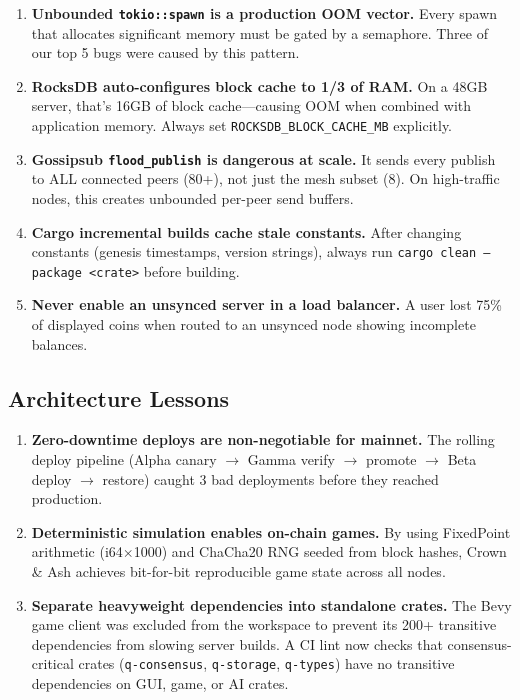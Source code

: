\documentclass[11pt,a4paper]{article}
\begin{document}
\begin{enumerate}[leftmargin=*]
    \item \textbf{Unbounded \texttt{tokio::spawn} is a production OOM vector.} Every spawn that allocates significant memory must be gated by a semaphore. Three of our top 5 bugs were caused by this pattern.

    \item \textbf{RocksDB auto-configures block cache to 1/3 of RAM.} On a 48GB server, that's 16GB of block cache---causing OOM when combined with application memory. Always set \texttt{ROCKSDB\_BLOCK\_CACHE\_MB} explicitly.

    \item \textbf{Gossipsub \texttt{flood\_publish} is dangerous at scale.} It sends every publish to ALL connected peers (80+), not just the mesh subset (8). On high-traffic nodes, this creates unbounded per-peer send buffers.

    \item \textbf{Cargo incremental builds cache stale constants.} After changing constants (genesis timestamps, version strings), always run \texttt{cargo clean --package <crate>} before building.

    \item \textbf{Never enable an unsynced server in a load balancer.} A user lost 75\% of displayed coins when routed to an unsynced node showing incomplete balances.
\end{enumerate}

\subsection{Architecture Lessons}

\begin{enumerate}[leftmargin=*]
    \item \textbf{Zero-downtime deploys are non-negotiable for mainnet.} The rolling deploy pipeline (Alpha canary $\rightarrow$ Gamma verify $\rightarrow$ promote $\rightarrow$ Beta deploy $\rightarrow$ restore) caught 3 bad deployments before they reached production.

    \item \textbf{Deterministic simulation enables on-chain games.} By using FixedPoint arithmetic (i64$\times$1000) and ChaCha20 RNG seeded from block hashes, Crown \& Ash achieves bit-for-bit reproducible game state across all nodes.

    \item \textbf{Separate heavyweight dependencies into standalone crates.} The Bevy game client was excluded from the workspace to prevent its 200+ transitive dependencies from slowing server builds. A CI lint now checks that consensus-critical crates (\texttt{q-consensus}, \texttt{q-storage}, \texttt{q-types}) have no transitive dependencies on GUI, game, or AI crates.
\end{enumerate}
\end{document}
